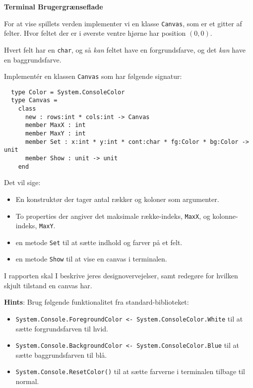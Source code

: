 \textbf{Terminal Brugergrænseflade}

For at vise spillets verden implementer vi en klasse
\lstinline{Canvas}, som er et gitter af felter. Hvor feltet
 der er i øverste ventre hjørne har position $(0,0)$.

Hvert felt har en \lstinline{char}, og så \emph{kan}
feltet have en forgrundsfarve, og det \emph{kan} have en baggrundsfarve.

Implementér en klassen \lstinline{Canvas} som har følgende signatur:

\begin{lstlisting}
  type Color = System.ConsoleColor
  type Canvas =
    class
      new : rows:int * cols:int -> Canvas
      member MaxX : int
      member MaxY : int
      member Set : x:int * y:int * cont:char * fg:Color * bg:Color -> unit
      member Show : unit -> unit
    end
\end{lstlisting}

Det vil sige:
\begin{itemize}
\item En konstruktør der tager antal rækker og koloner som argumenter.
\item To properties der angiver det maksimale række-indeks, \lstinline{MaxX}, og
  kolonne-indeks, \lstinline{MaxY}.
\item en metode \lstinline{Set} til at sætte indhold og farver på et felt.
\item en metode \lstinline{Show} til at vise en canvas i terminalen.
\end{itemize}

I rapporten skal I beskrive jeres designovervejelser, samt redegøre for
hvilken skjult tilstand en canvas har.

\textbf{Hints}: Brug følgende funktionalitet fra standard-biblioteket:

\begin{itemize}
\item \lstinline{System.Console.ForegroundColor <- System.ConsoleColor.White}
  til at sætte forgrundsfarven til hvid.
\item \lstinline{System.Console.BackgroundColor <- System.ConsoleColor.Blue} til
  at sætte baggrundsfarven til blå.
\item \lstinline{System.Console.ResetColor()} til at sætte farverne i terminalen
  tilbage til normal.
\end{itemize}


